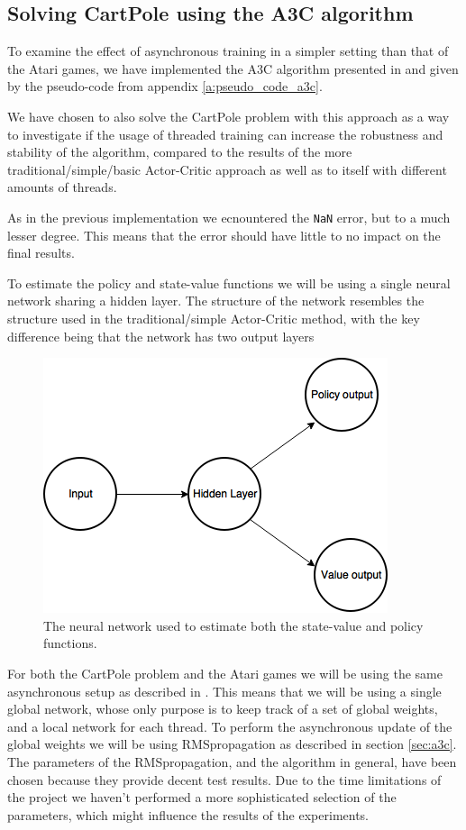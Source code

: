 \documentclass[11pt]{article}
\begin{document}
\subsection{Solving CartPole using the A3C algorithm}

To examine the effect of asynchronous training in a simpler setting than
that of the Atari games, we have implemented the A3C algorithm presented
in \cite{a3c} and given by the pseudo-code from appendix \ref{a:pseudo_code_a3c}.

We have chosen to also solve the CartPole problem with this approach as a way to
investigate if the usage of threaded training can increase the robustness
and stability of the algorithm, compared to the results of the more
traditional/simple/basic Actor-Critic approach as well as
to itself with different amounts of threads.

As in the previous implementation we ecnountered the \texttt{NaN} error,
but to a much lesser degree.
This means that the error should have little to no impact on
the final results.

To estimate the policy and state-value functions we will be using a single
neural network sharing a hidden layer.
The structure of the network resembles the structure used in the traditional/simple
Actor-Critic method, with the key difference being that the network has
two output layers

\begin{figure}[H]
    \centering
    \includegraphics[scale=0.5]{include/shared_cartpole.png}
    \caption{The neural network used to estimate both the state-value
             and policy functions.}
    \label{fig:s_cartpole}
\end{figure}

For both the CartPole problem and the Atari games we will be using the same asynchronous setup
as described in \cite{a3c}.
This means that we will be using a single global network, whose only
purpose is to keep track of a set of global weights, and a local network
for each thread.
To perform the asynchronous update of the global weights we will be using
RMSpropagation as described in section \ref{sec:a3c}.
The parameters of the RMSpropagation, and the algorithm in general, have
been chosen because they provide decent test results.
Due to the time limitations of the project we haven't performed
a more sophisticated selection of the parameters, which might
influence the results of the experiments.
\end{document}
